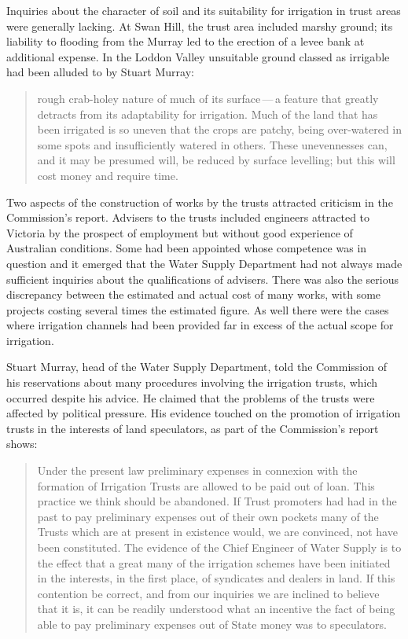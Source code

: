 Inquiries about the character of soil and its suitability for
irrigation in trust areas were generally lacking.  At Swan Hill, the
trust area included marshy ground; its liability to flooding from the
Murray led to the erection of a levee bank at additional expense.  In
the Loddon Valley unsuitable ground classed as irrigable had been
alluded to by Stuart Murray:
\begin{quote}
	rough crab-holey nature of much of its surface\,---\,a feature
	that greatly detracts from its adaptability for irrigation.
	Much of the land that has been irrigated is so uneven that the
	crops are patchy, being over-watered in some spots and
	insufficiently watered in others.  These unevennesses can, and
	it may be presumed will, be reduced by surface levelling; but
	this will cost money and require time.
\end{quote}

Two aspects of the construction of works by the trusts attracted
criticism in the Commission's report.  Advisers to the trusts included
engineers attracted to Victoria by the prospect of employment but
without good experience of Australian conditions.  Some had been
appointed whose competence was in question and it emerged that the
Water Supply Department had not always made sufficient inquiries about
the qualifications of advisers.  There was also the serious
discrepancy between the estimated and actual cost of many works, with
some projects costing several times the estimated figure.  As well
there were the cases where irrigation channels had been provided far
in excess of the actual scope for irrigation.

Stuart Murray, head of the Water Supply Department, told the
Commission of his reservations about many procedures involving the
irrigation trusts, which occurred despite his advice.  He claimed that
the problems of the trusts were affected by political pressure.  His
evidence touched on the promotion of irrigation trusts in the
interests of land speculators, as part of the Commission's report
shows:
\begin{quote}
	Under the present law preliminary expenses in connexion with
	the formation of Irrigation Trusts are allowed to be paid out
	of loan.  This practice we think should be abandoned.  If
	Trust promoters had had in the past to pay preliminary
	expenses out of their own pockets many of the Trusts which are
	at present in existence would, we are convinced, not have been
	constituted.  The evidence of the Chief Engineer of Water
	Supply is to the effect that a great many of the irrigation
	schemes have been initiated in the interests, in the first
	place, of syndicates and dealers in land.  If this contention
	be correct, and from our inquiries we are inclined to believe
	that it is, it can be readily understood what an incentive the
	fact of being able to pay preliminary expenses out of State
	money was to speculators.
\end{quote}

